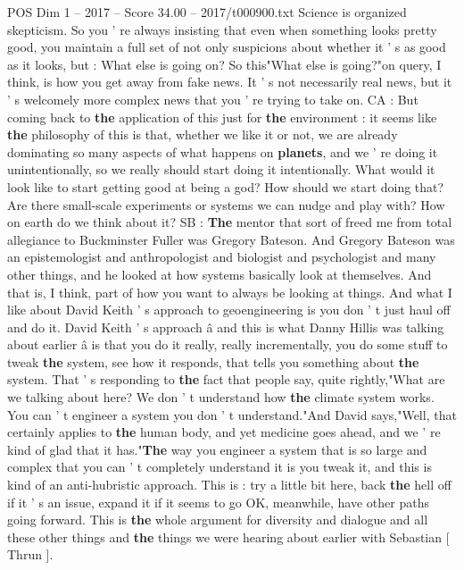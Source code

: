 \begin{textsample}{POS Dim 1 – 2017 – Score 34.00 – 2017/t000900.txt}
Science is organized skepticism.
So you ' re always insisting that even when something looks pretty good, you maintain a full set of not only suspicions about whether it ' s as good as it looks, but : What else is going on?
So this"What else is going?"on query, I think, is how you get away from fake news.
It ' s not necessarily real news, but it ' s welcomely more complex news that you ' re trying to take on.
CA : But coming back to \textbf{the} application of this just for \textbf{the} environment : it seems like \textbf{the} philosophy of this is that, whether we like it or not, we are already dominating so many aspects of what happens on \textbf{planets}, and we ' re doing it unintentionally, so we really should start doing it intentionally.
What would it look like to start getting good at being a god?
How should we start doing that?
Are there small-scale experiments or systems we can nudge and play with?
How on earth do we think about it?
SB : \textbf{The} mentor that sort of freed me from total allegiance to Buckminster Fuller was Gregory Bateson.
And Gregory Bateson was an epistemologist and anthropologist and biologist and psychologist and many other things, and he looked at how systems basically look at themselves.
And that is, I think, part of how you want to always be looking at things.
And what I like about David Keith ' s approach to geoengineering is you don ' t just haul off and do it.
David Keith ' s approach â and this is what Danny Hillis was talking about earlier â is that you do it really, really incrementally, you do some stuff to tweak \textbf{the} system, see how it responds, that tells you something about \textbf{the} system.
That ' s responding to \textbf{the} fact that people say, quite rightly,"What are we talking about here?
We don ' t understand how \textbf{the} climate system works.
You can ' t engineer a system you don ' t understand."And David says,"Well, that certainly applies to \textbf{the} human body, and yet medicine goes ahead, and we ' re kind of glad that it has."\textbf{The} way you engineer a system that is so large and complex that you can ' t completely understand it is you tweak it, and this is kind of an anti-hubristic approach.
This is : try a little bit here, back \textbf{the} hell off if it ' s an issue, expand it if it seems to go OK, meanwhile, have other paths going forward.
This is \textbf{the} whole argument for diversity and dialogue and all these other things and \textbf{the} things we were hearing about earlier with Sebastian [ Thrun ].

\end{textsample}

